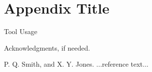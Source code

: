 \documentclass[preprint]{sigplanconf}
\begin{document}
\appendix
\section{Appendix Title}
Tool Usage 
\acks

Acknowledgments, if needed.





\begin{thebibliography}{}
\softraggedright

P. Q. Smith, and X. Y. Jones. ...reference text...

\end{thebibliography}
\end{document}
